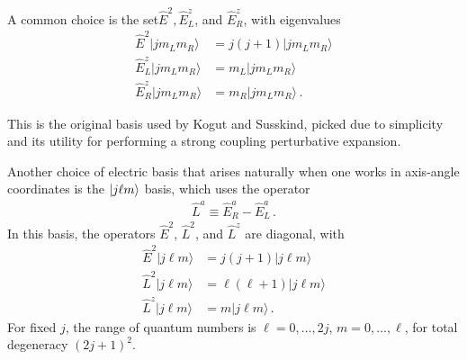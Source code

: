 \documentclass[reprint,superscriptaddress,pra,nofootinbib,preprintnumbers,floatfix]{revtex4-1}
\begin{document}
A common choice is the set$\hat{E}^2, \hat{E}_L^z$, and $\hat{E}^z_R$, with eigenvalues
\begin{align}
\label{eq:Eop_electric_basis_app}
    \hat E^2 | j {m_L}{m_R} \rangle &= j(j+1)| j {m_L}{m_R} \rangle
    \nonumber\\
    \hat E^z_L | j {m_L}{m_R} \rangle &= m_L | j {m_L}{m_R} \rangle
    \nonumber\\
    \hat E^z_R | j {m_L}{m_R} \rangle &= m_R | j {m_L}{m_R} \rangle
    \,.
\end{align}

This is the original basis used by Kogut and Susskind, picked due to simplicity and its utility for performing a strong coupling perturbative expansion.

Another choice of electric basis that arises naturally when one works in axis-angle coordinates is the $\ket{j \ell m}$ basis, which uses the operator
\begin{align}
    \hat L^a \equiv \hat E^a_R - \hat E^a_L\,.
\end{align}
In this basis, the operators $\hat{E}^2$, $\hat{L}^2$, and $\hat{L}^z$ are diagonal, with
%
\begin{align}
        \hat E^2 | j \ell m \rangle &= j(j+1)| j \ell m \rangle
    \nonumber\\
    \hat L^2 | j \ell m \rangle &= \ell(\ell+1) | j \ell m \rangle
    \nonumber\\
    \hat L^z | j \ell m \rangle &= m | j \ell m \rangle
    \,.
\end{align}
%
For fixed $j$, the range of quantum numbers is $\ell=0,\hdots,2j$, $m=0,\hdots,\ell$, for total degeneracy $(2j+1)^2$.
\end{document}
